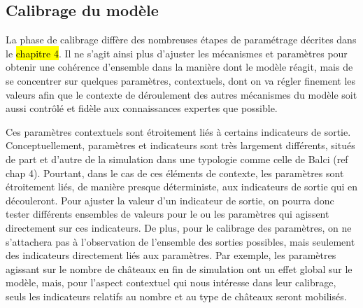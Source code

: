 %
%


\subsection{Calibrage du modèle \label{subsec:calibrage}}

La phase de calibrage diffère des nombreuses étapes de paramétrage décrites dans le \hl{chapitre 4}.
Il  ne s'agit ainsi plus d'ajuster les mécanismes et paramètres pour obtenir une cohérence d'ensemble dans la manière dont le modèle réagit, mais de se concentrer sur quelques paramètres, contextuels, dont on va régler finement les valeurs afin que le contexte de déroulement des autres mécanismes du modèle soit aussi contrôlé et fidèle aux connaissances expertes que possible.

Ces paramètres contextuels sont étroitement liés à certains indicateurs de sortie.
Conceptuellement, paramètres et indicateurs sont très largement différents, situés de part et d'autre de la simulation dans une typologie comme celle de Balci (ref chap 4).
Pourtant, dans le cas de ces éléments de contexte, les paramètres sont étroitement liés, de manière presque déterministe, aux indicateurs de sortie qui en découleront.
Pour \og ajuster\fg{} la valeur d'un indicateur de sortie, on pourra donc tester différents ensembles de valeurs pour le ou les paramètres qui agissent directement sur ces indicateurs.
De plus, pour le calibrage des paramètres, on ne s'attachera pas à l'observation de l'ensemble des sorties possibles, mais seulement des indicateurs directement liés aux paramètres.
Par exemple, les paramètres agissant sur le nombre de châteaux en fin de simulation ont un effet global sur le modèle, mais, pour l'aspect contextuel qui nous intéresse dans leur calibrage, seuls les indicateurs relatifs au nombre et au type de châteaux seront mobilisés.

